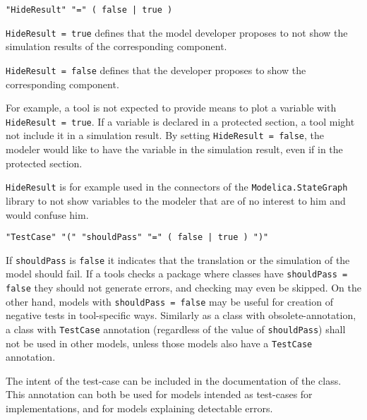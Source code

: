 \begin{annotationdefinition}[HideResult]
\begin{synopsis}[grammar]\begin{lstlisting}
"HideResult" "=" ( false | true )
\end{lstlisting}\end{synopsis}
\begin{semantics}
\lstinline!HideResult = true! defines that the model developer proposes to not show the simulation results of the corresponding component.

\lstinline!HideResult = false! defines that the developer proposes to show the corresponding component.

\begin{nonnormative}
For example, a tool is not expected to provide means to plot a variable with \lstinline!HideResult = true!.  If a variable is declared in a protected section, a tool might not include it in a simulation result. By setting \lstinline!HideResult = false!, the modeler would like to have the variable in the simulation result, even if in the protected section.

\lstinline!HideResult! is for example used in the connectors of the \lstinline!Modelica.StateGraph! library to not show variables to the modeler that are of no interest to him and would confuse him.
\end{nonnormative}
\end{semantics}
\end{annotationdefinition}

\begin{annotationdefinition}[TestCase]
\begin{synopsis}[grammar]\begin{lstlisting}
"TestCase" "(" "shouldPass" "=" ( false | true ) ")"
\end{lstlisting}\end{synopsis}
\begin{semantics}
If \lstinline!shouldPass! is \lstinline!false! it indicates that the translation or the simulation of the model should fail.
If a tools checks a package where classes have \lstinline!shouldPass = false! they should not generate errors, and checking may even be skipped.
On the other hand, models with \lstinline!shouldPass = false! may be useful for creation of negative tests in tool-specific ways.
Similarly as a class with obsolete-annotation, a class with \lstinline!TestCase! annotation (regardless of the value of \lstinline!shouldPass!) shall not be used in other models, unless those models also have a \lstinline!TestCase! annotation.

\begin{nonnormative}
The intent of the test-case can be included in the documentation of the class.
This annotation can both be used for models intended as test-cases for implementations, and for models explaining detectable errors.
\end{nonnormative}
\end{semantics}
\end{annotationdefinition}



